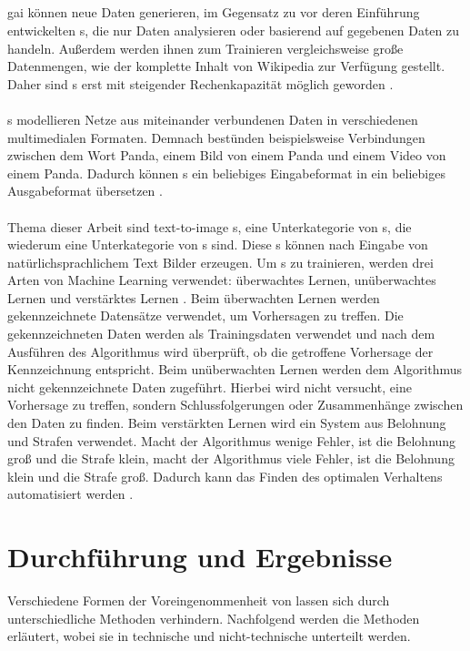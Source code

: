 \documentclass[hidelinks,12pt]{report}
\begin{document}
\section{}\label{def_ki}
\gls{gai} können neue Daten generieren, im Gegensatz zu vor deren Einführung entwickelten s, die nur Daten analysieren oder basierend auf gegebenen Daten zu handeln. Außerdem werden ihnen zum Trainieren vergleichsweise große Datenmengen, wie der komplette Inhalt von Wikipedia zur Verfügung gestellt. Daher sind s erst mit steigender Rechenkapazität möglich geworden \cite{Roberto}. 
\\\\
s modellieren Netze aus miteinander verbundenen Daten in verschiedenen multimedialen Formaten. Demnach bestünden beispielsweise Verbindungen zwischen dem Wort Panda, einem Bild von einem Panda und einem Video von einem Panda. Dadurch können s ein beliebiges Eingabeformat in ein beliebiges Ausgabeformat übersetzen \cite{Roberto}. 
\\\\
Thema dieser Arbeit sind text-to-image s, eine Unterkategorie von s, die wiederum eine Unterkategorie von s sind. Diese s können nach Eingabe von natürlichsprachlichem Text Bilder erzeugen. Um  s zu trainieren, werden drei Arten von Machine Learning verwendet: überwachtes Lernen, unüberwachtes Lernen und verstärktes Lernen \cite{Roberto}. Beim überwachten Lernen werden gekennzeichnete Datensätze verwendet, um Vorhersagen zu treffen. Die gekennzeichneten Daten werden als Trainingsdaten verwendet und nach dem Ausführen des Algorithmus wird überprüft, ob die getroffene Vorhersage der Kennzeichnung entspricht. Beim unüberwachten Lernen werden dem Algorithmus nicht gekennzeichnete Daten zugeführt. Hierbei wird nicht versucht, eine Vorhersage zu treffen, sondern Schlussfolgerungen oder Zusammenhänge zwischen den Daten zu finden. Beim verstärkten Lernen wird ein System aus Belohnung und Strafen verwendet. Macht der Algorithmus wenige Fehler, ist die Belohnung groß und die Strafe klein, macht der Algorithmus viele Fehler, ist die Belohnung klein und die Strafe groß. Dadurch kann das Finden des optimalen Verhaltens automatisiert werden \cite{serafeim}.






\chapter{Durchführung und Ergebnisse}\label{execution}
Verschiedene Formen der Voreingenommenheit von  lassen sich durch unterschiedliche Methoden verhindern. Nachfolgend werden die Methoden erläutert, wobei sie in technische und nicht-technische unterteilt werden.
\end{document}
